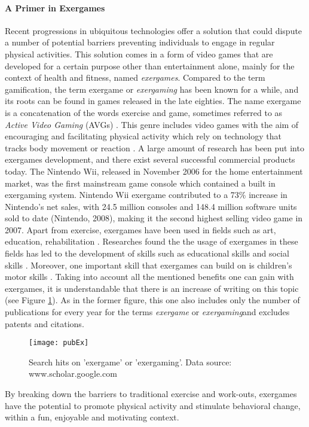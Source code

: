 \paragraph{A Primer in Exergames}
Recent progressions in ubiquitous technologies offer a solution that could dispute a number of potential barriers preventing individuals to engage in regular physical activities. This solution comes in a form of video games that are developed for a certain purpose other than entertainment alone, mainly for the context of health and fitness, named \textit{exergames}. Compared to the term gamification, the term exergame or \textit{exergaming} has been known for a while, and its roots can be found in games released in the late eighties. The name exergame is a concatenation of the words exercise and game, sometimes referred to as \textit{Active Video Gaming} (AVGs) \cite{altamimi2012survey}. This genre includes video games with the aim of encouraging and facilitating physical activity which rely on technology that tracks body movement or reaction \cite{altamimi2012survey}. A large amount of research has been put into exergames development, and there exist several successful commercial
products today. The Nintendo Wii, released in November 2006 for the home entertainment market,
was the first mainstream game console which contained a built in exergaming system. Nintendo Wii exergame contributed to a
73\% increase in Nintendo's net sales, with 24.5 million consoles and 148.4 million software units sold to date (Nintendo, 2008), making it the second highest selling video game in 2007.%
Apart from exercise, exergames have been used in fields such as art, education, rehabilitation  \cite{altamimi2012survey}. Researches found the the usage of exergames in these fields has led to the 
development of skills such as educational skills and social skills \cite{altamimi2012survey}. 
Moreover, one important skill that exergames can
build on is children's motor skills \cite{delgado2009low}. Taking into account all the mentioned benefits one can gain with exergames, it is understandable that there is an increase of writing on this topic (see 
Figure \ref{fig:pubEx}). As in the former figure, this one also includes only the number of publications for every year for the terms \textit{exergame} or \textit{exergaming}and excludes patents and citations. 
\begin{figure}[h]
    \centering
    \texttt{[image: pubEx]}
    \caption{Search hits on 'exergame' or 'exergaming'. Data source: www.scholar.google.com}
    \label{fig:pubEx}
\end{figure}
By breaking down the barriers to traditional exercise and work-outs, exergames have the potential to promote physical
activity and stimulate behavioral change, within a fun, enjoyable and motivating context.
